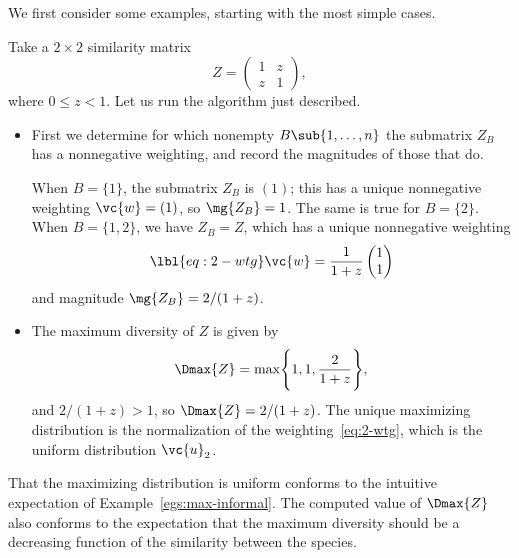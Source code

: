 We first consider some examples, starting with the most simple cases.

\begin{example}
Take a $2 \times 2$ similarity matrix
\[
Z = 
\begin{pmatrix}
1       &z      \\
z       &1
\end{pmatrix},
\]
where $0 \leq z < 1$.  Let us run the algorithm just described.
% 
\begin{itemize}
\item
First we determine for which nonempty $B \sub \{1, \ldots, n\}$ the submatrix
$Z_B$ has a nonnegative weighting, and record the magnitudes of those that
do.  

When $B = \{1\}$, the submatrix $Z_B$ is $(1)$; this has a unique
nonnegative weighting $\vc{w} = (1)$, so $\mg{Z_B} = 1$.  The same is true
for $B = \{2\}$.  When $B = \{1, 2\}$, we have $Z_B = Z$, which has a
unique nonnegative weighting 
% 
\begin{equation}
\lbl{eq:2-wtg}
\vc{w} = \frac{1}{1 + z} \begin{pmatrix} 1\\ 1 \end{pmatrix}
\end{equation}
% 
and magnitude $\mg{Z_B} = 2/(1 + z)$.  

\item
The maximum diversity of $Z$ is given by 
\[
\Dmax{Z} 
= 
\max\Biggl\{ 1, 1, \frac{2}{1 + z} \Biggr\}, 
\]
and $2/(1 + z) > 1$, so $\Dmax{Z} = 2/(1 + z)$.  The unique
maximizing distribution is the normalization of the
weighting~\eqref{eq:2-wtg}, which is the uniform distribution $\vc{u}_2$.
\end{itemize}
% 
That the maximizing distribution is uniform conforms to the intuitive
expectation of Example~\ref{egs:max-informal}.  The computed value of
$\Dmax{Z}$ also conforms to the expectation that the maximum diversity
should be a decreasing function of the similarity between the species.
\end{example}

